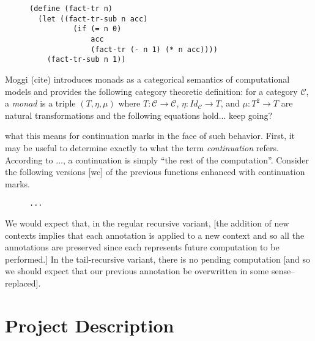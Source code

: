 \documentclass[ms]{byuprop}
\begin{document}
\begin{figure}
\label{fac-tail-rec}
\begin{verbatim}
(define (fact-tr n)
  (let ((fact-tr-sub n acc)
          (if (= n 0)
              acc
              (fact-tr (- n 1) (* n acc))))
    (fact-tr-sub n 1))
\end{verbatim}
\end{figure}
Moggi (cite) introduces monads as a categorical semantics of computational models and provides the following category theoretic definition: for a category $\mathcal{C}$, a \emph{monad} is a triple $(T,\eta,\mu)$ where $T:\mathcal{C}\rightarrow\mathcal{C}$, $\eta:Id_{\mathcal{C}}\rightarrow T$, and $\mu:T^{2}\rightarrow T$ are natural transformations and the following equations hold... keep going?

what this means for continuation marks in the face of such behavior. 
First, it may be useful to determine exactly to what the term 
\emph{continuation} refers. According to ..., a continuation is simply 
``the rest of the computation''. Consider the following versions [wc] of 
the previous functions enhanced with continuation marks.

\begin{figure}
\label{fac-rec-cm}
\begin{verbatim}
...
\end{verbatim}
\end{figure}


We would expect that, in the regular recursive variant, [the addition of 
new contexts implies that each annotation is applied to a new context 
and so all the annotations are preserved since each represents future 
computation to be performed.] In the tail-recursive variant, there is no 
pending computation [and so we should expect that our previous 
annotation be overwritten in some sense--replaced].






\section{Project Description}
\end{document}
